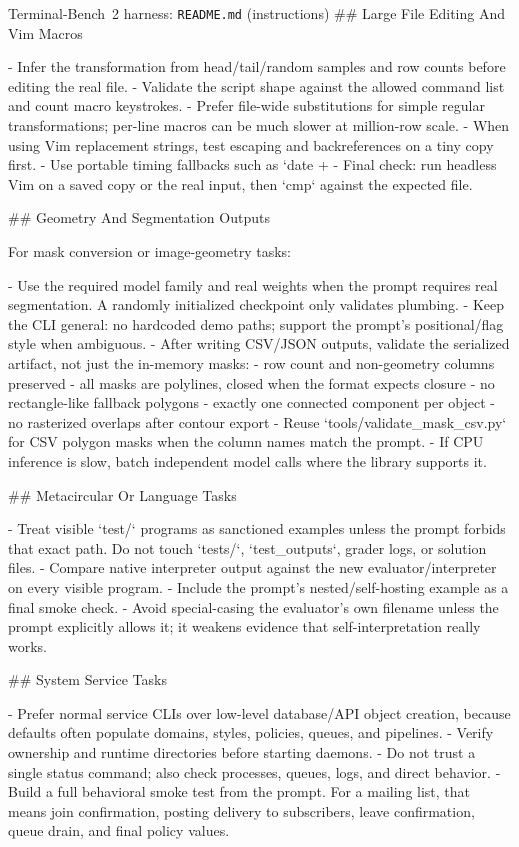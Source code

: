 \documentclass{llmxive}
\begin{document}
\begin{promptbox}{Terminal-Bench~2 harness: \texttt{README.md} (instructions)}
## Large File Editing And Vim Macros

- Infer the transformation from head/tail/random samples and row counts before editing the real file.
- Validate the script shape against the allowed command list and count macro keystrokes.
- Prefer file-wide substitutions for simple regular transformations; per-line macros can be much slower at million-row scale.
- When using Vim replacement strings, test escaping and backreferences on a tiny copy first.
- Use portable timing fallbacks such as `date +%
- Final check: run headless Vim on a saved copy or the real input, then `cmp` against the expected file.

## Geometry And Segmentation Outputs

For mask conversion or image-geometry tasks:

- Use the required model family and real weights when the prompt requires real segmentation. A randomly initialized checkpoint only validates plumbing.
- Keep the CLI general: no hardcoded demo paths; support the prompt's positional/flag style when ambiguous.
- After writing CSV/JSON outputs, validate the serialized artifact, not just the in-memory masks:
  - row count and non-geometry columns preserved
  - all masks are polylines, closed when the format expects closure
  - no rectangle-like fallback polygons
  - exactly one connected component per object
  - no rasterized overlaps after contour export
- Reuse `tools/validate_mask_csv.py` for CSV polygon masks when the column names match the prompt.
- If CPU inference is slow, batch independent model calls where the library supports it.

## Metacircular Or Language Tasks

- Treat visible `test/` programs as sanctioned examples unless the prompt forbids that exact path. Do not touch `tests/`, `test_outputs`, grader logs, or solution files.
- Compare native interpreter output against the new evaluator/interpreter on every visible program.
- Include the prompt's nested/self-hosting example as a final smoke check.
- Avoid special-casing the evaluator's own filename unless the prompt explicitly allows it; it weakens evidence that self-interpretation really works.

## System Service Tasks

- Prefer normal service CLIs over low-level database/API object creation, because defaults often populate domains, styles, policies, queues, and pipelines.
- Verify ownership and runtime directories before starting daemons.
- Do not trust a single status command; also check processes, queues, logs, and direct behavior.
- Build a full behavioral smoke test from the prompt. For a mailing list, that means join confirmation, posting delivery to subscribers, leave confirmation, queue drain, and final policy values.


\end{promptbox}
\end{document}
